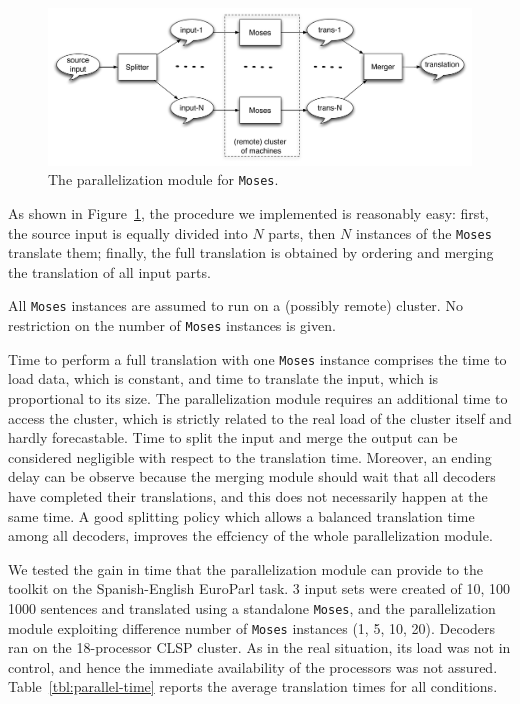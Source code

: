 \documentclass[11pt]{book}
\theoremstyle{plain}
\begin{document}
\begin{figure}
\begin{center}
\label{fig:parallel}
\caption{The parallelization module for {\tt Moses}.}
 \includegraphics[width=\columnwidth]{Moses-parallel}
\end{center}
 \end{figure}
 
As shown in Figure~\ref{fig:parallel}, the procedure we implemented is reasonably easy:
first, the source input is equally divided into $N$ parts, then $N$ instances of the {\tt Moses} translate them; finally, the full translation is obtained by ordering and merging the translation of all input parts.

All {\tt Moses} instances are assumed to run on a (possibly remote) cluster. No restriction on the number of {\tt Moses} instances is given.


Time to perform a full translation with one {\tt Moses} instance comprises the time to load data, which is constant, and time to translate the input, which is proportional to its size.
The parallelization module requires an additional time to access the cluster, which is strictly related to the real load of the cluster itself and hardly forecastable.
Time to split the input and merge the output can be considered negligible with respect to the translation time.
Moreover, an ending delay can be observe because the merging module should wait that all decoders have completed their translations, and this does not necessarily happen at the same time. A good splitting policy which allows a balanced translation time among all decoders,  improves the effciency of the whole parallelization module.

We tested the gain in time that  the parallelization module can provide to the toolkit on the Spanish-English EuroParl task. 3 input sets were created of 10, 100 1000 sentences and translated using a standalone  {\tt Moses}, and the parallelization module exploiting difference number of {\tt Moses} instances (1, 5, 10, 20).
Decoders ran on the 18-processor CLSP cluster. As in the real situation, its load was not in control, and hence the immediate availability of the processors was not assured. Table~\ref{tbl:parallel-time} reports the average translation times for all conditions.
\end{document}
